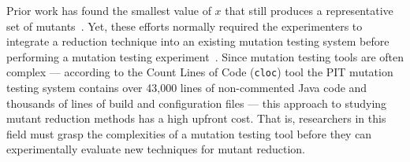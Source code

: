 

Prior work has found the smallest value of $x$ that still produces a representative set of
mutants~\cite{jia2011analysis, mathur1994empirical}. Yet, these efforts normally required the experimenters to integrate
a reduction technique into an existing mutation testing system before performing a mutation testing
experiment~\cite{demillo1988extended, king1991fortran}. Since mutation testing tools are often complex --- according to
the Count Lines of Code ({\tt cloc}) tool the PIT mutation testing system contains over 43,000 lines of non-commented
Java code and thousands of lines of build and configuration files --- this approach to studying mutant reduction methods
has a high upfront cost. That is, researchers in this field must grasp the complexities of a mutation testing tool
before they can experimentally evaluate new techniques for mutant reduction.



